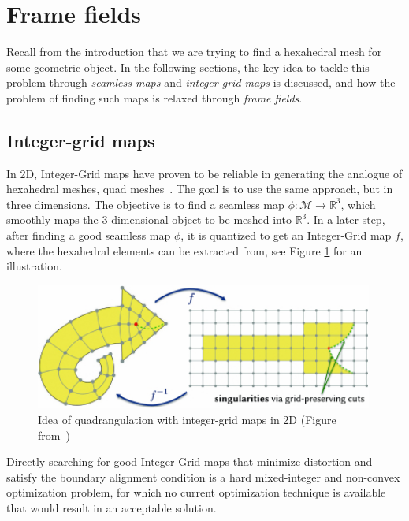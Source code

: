 \documentclass[../thesis.tex]{subfiles}
\begin{document}
\section{Frame fields}
Recall from the introduction that we are trying to find a hexahedral mesh
for some geometric object. In the following sections, the key idea to
tackle this problem through \emph{seamless maps} and \emph{integer-grid maps} is discussed, and
how the problem of finding such maps is relaxed through \emph{frame fields}.
\subsection{Integer-grid maps}

In 2D, Integer-Grid maps have proven to be reliable
in generating the analogue of hexahedral meshes, quad meshes~\cite{integer-grid}.
The goal is to use the same approach, but in three dimensions.
The objective is to find a seamless map
$\phi : \mathcal{M} \to \mathbb{R}^3$, which smoothly maps the $3$-dimensional object
to be meshed into $\mathbb{R}^3$.
In a later step, after finding a good seamless map $\phi$, it is quantized to get an
Integer-Grid map $f$, where the hexahedral elements can be extracted from,  see Figure \ref{fig:integer-grid} for an illustration.
\begin{figure}[htb]
  \centering
  \includegraphics[width=30em]{figures/integer-grid-rough}
  \caption{Idea of quadrangulation with integer-grid maps in 2D (Figure from~\cite{Hex22})}
  \label{fig:integer-grid}
\end{figure}
Directly searching for good Integer-Grid maps that minimize distortion and satisfy the boundary alignment
condition is a hard mixed-integer and non-convex optimization problem, for which no current
optimization technique is available that would result in an acceptable solution.
\end{document}
